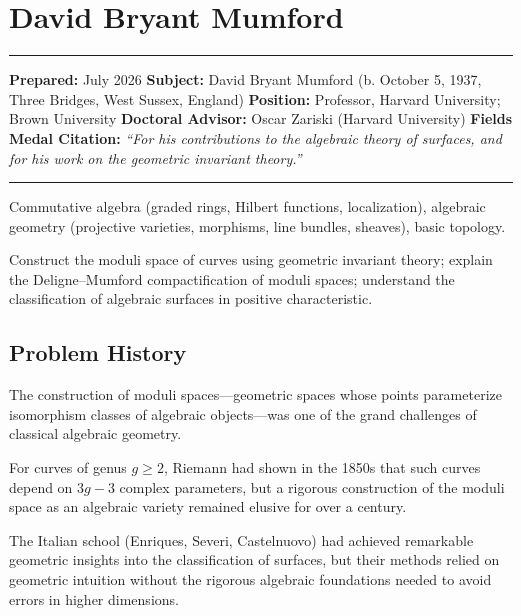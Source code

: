 \chapter{David Bryant Mumford}\label{ch1974davidbryantmumford:david-bryant-mumford-fields-medal-1974-a-comprehensive-report-on-his-work-and-impact}

\begin{center}\rule{0.5\linewidth}{0.5pt}\end{center}

\textbf{Prepared:} July 2026
\textbf{Subject:} David Bryant Mumford (b. October 5, 1937, Three Bridges, West Sussex, England)
\textbf{Position:} Professor, Harvard University; Brown University
\textbf{Doctoral Advisor:} Oscar Zariski (Harvard University)
\textbf{Fields Medal Citation:} \emph{``For his contributions to the algebraic theory of surfaces, and for his work on the geometric invariant theory.''}

\begin{center}\rule{0.5\linewidth}{0.5pt}\end{center}

\begin{prereqs}
Commutative algebra (graded rings, Hilbert functions, localization), algebraic geometry (projective varieties, morphisms, line bundles, sheaves), basic topology.
\end{prereqs}

\begin{objectives}
Construct the moduli space of curves using geometric invariant theory; explain the Deligne--Mumford compactification of moduli spaces; understand the classification of algebraic surfaces in positive characteristic.
\end{objectives}

\section{Problem History}

The construction of moduli spaces---geometric spaces whose points parameterize isomorphism classes of algebraic objects---was one of the grand challenges of classical algebraic geometry.

For curves of genus $g \geq 2$, Riemann had shown in the 1850s that such curves depend on $3g - 3$ complex parameters, but a rigorous construction of the moduli space as an algebraic variety remained elusive for over a century.

The Italian school (Enriques, Severi, Castelnuovo) had achieved remarkable geometric insights into the classification of surfaces, but their methods relied on geometric intuition without the rigorous algebraic foundations needed to avoid errors in higher dimensions.

